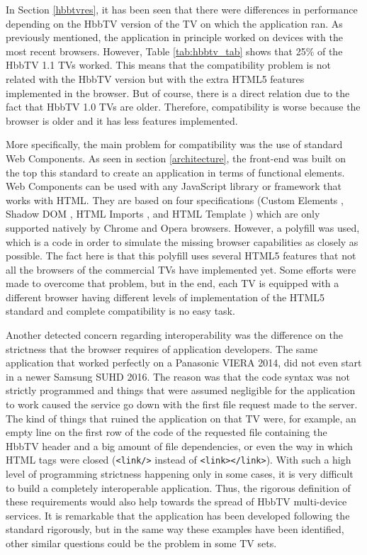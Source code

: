 In Section \ref{hbbtvres}, it has been seen that there were differences in performance depending on the HbbTV version of the TV on which the application ran. As previously mentioned, the application in principle worked on devices with the most recent browsers. However, Table \ref{tab:hbbtv_tab} shows that 25\% of the HbbTV 1.1 TVs worked. This means that the compatibility problem is not related with the HbbTV version but with the extra HTML5 features implemented in the browser. But of course, there is a direct relation due to the fact that HbbTV 1.0 TVs are older. Therefore, compatibility is worse because the browser is older and it has less features implemented.

More specifically, the main problem for compatibility was the use of standard Web Components. As seen in section \ref{architecture}, the front-end was built on the top this standard to create an application in terms of functional elements. Web Components can be used with any JavaScript library or framework that works with HTML. They are based on four specifications (Custom Elements \cite{customelements}, Shadow DOM \cite{shadowdom}, HTML Imports \cite{htmlimports}, and HTML Template \cite{htmltemplate}) which are only supported natively by Chrome \cite{chrome} and Opera \cite{opera} browsers. However, a polyfill \cite{wcpolyfill} was used, which is a code in order to simulate the missing browser capabilities as closely as possible. The fact here is that this polyfill uses several HTML5 features that not all the browsers of the commercial TVs have implemented yet. Some efforts were made to overcome that problem, but in the end, each TV is equipped with a different browser having different levels of implementation of the HTML5 standard and complete compatibility is no easy task.

Another detected concern regarding interoperability was the difference on the strictness that the browser requires of application developers. The same application that worked perfectly on a Panasonic VIERA 2014, did not even start in a newer Samsung SUHD 2016. The reason was that the code syntax was not strictly programmed and things that were assumed negligible for the application to work caused the service go down with the first file request made to the server. The kind of things that ruined the application on that TV were, for example, an empty line on the first row of the code of the requested file containing the HbbTV header and a big amount of file dependencies, or even the way in which HTML tags were closed (\texttt{\textless link/\textgreater}  instead of \texttt{\textless link\textgreater \textless/link\textgreater}). With such a high level of programming strictness happening only in some cases, it is very difficult to build a completely interoperable application. Thus, the rigorous definition of these requirements would also help towards the spread of HbbTV multi-device services. It is remarkable that the application has been developed following the standard rigorously, but in the same way these examples have been identified, other similar questions could be the problem in some TV sets.

